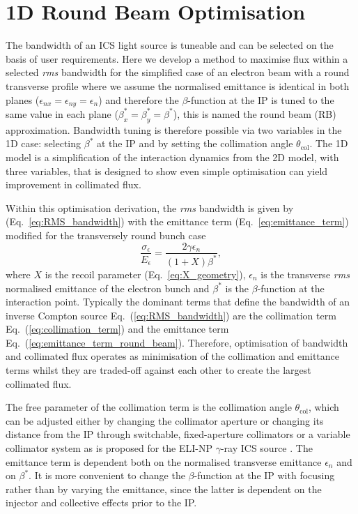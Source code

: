 \documentclass[../main.tex]{subfiles}
\begin{document}
\section{1D Round Beam Optimisation}
\label{sec:RB_optimisation}

The bandwidth of an ICS light source is tuneable and can be selected on the basis of user requirements. Here we develop a method to maximise flux within a selected \textit{rms} bandwidth for the simplified case of an electron beam with a round transverse profile where we assume the normalised emittance is identical in both planes ($\epsilon_{nx} = \epsilon_{ny} = \epsilon_{n}$) and therefore the $\beta$-function at the IP is tuned to the same value in each plane ($\beta_{x}^{*} = \beta_{y}^{*} = \beta^{*}$), this is named the round beam (RB) approximation. Bandwidth tuning is therefore possible via two variables in the 1D case: selecting $\beta^{*}$ at the IP and by setting the collimation angle $\theta_{\mathrm{col}}$. The 1D model is a simplification of the interaction dynamics from the 2D model, with three variables, that is designed to show even simple optimisation can yield improvement in collimated flux.

Within this optimisation derivation, the \textit{rms} bandwidth is given by (Eq.~\ref{eq:RMS_bandwidth}) with the emittance term (Eq.~\ref{eq:emittance_term}) modified for the transversely round bunch case
\begin{equation}
\frac{\sigma_{\epsilon}}{E_{\epsilon}} = \frac{2\gamma\epsilon_{n}}{\left(1+X\right)\beta^{*}},
\label{eq:emittance_term_round_beam}    
\end{equation}
where $X$ is the recoil parameter (Eq.~\ref{eq:X_geometry}), $\epsilon_{n}$ is the transverse \textit{rms} normalised emittance of the electron bunch and $\beta^{*}$ is the $\beta$-function at the interaction point. Typically the dominant terms that define the bandwidth of an inverse Compton source Eq.~(\ref{eq:RMS_bandwidth}) are the collimation term Eq.~(\ref{eq:collimation_term}) and the emittance term Eq.~(\ref{eq:emittance_term_round_beam}). Therefore, optimisation of bandwidth and collimated flux operates as minimisation of the collimation and emittance terms whilst they are traded-off against each other to create the largest collimated flux.

The free parameter of the collimation term is the collimation angle $\theta_{\mathrm{col}}$, which can be adjusted either by changing the collimator aperture or changing its distance from the IP through switchable, fixed-aperture collimators or a variable collimator system as is proposed for the ELI-NP $\gamma$-ray ICS source \cite{paterno2017collimation}. The emittance term is dependent both on the normalised transverse emittance $\epsilon_{n}$ and on $\beta^{*}$. It is more convenient to change the $\beta$-function at the IP with focusing rather than by varying the emittance, since the latter is dependent on the injector and collective effects prior to the IP. 
\end{document}
